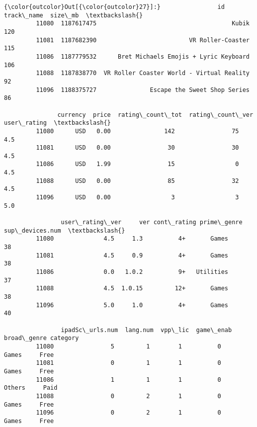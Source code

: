 \documentclass[11pt]{article}
\begin{document}
\begin{Verbatim}[commandchars=\\\{\}]
{\color{outcolor}Out[{\color{outcolor}27}]:}                id                                 track\_name  size\_mb  \textbackslash{}
         11080  1187617475                                      Kubik      120   
         11081  1187682390                          VR Roller-Coaster      115   
         11086  1187779532      Bret Michaels Emojis + Lyric Keyboard      106   
         11088  1187838770  VR Roller Coaster World - Virtual Reality       92   
         11096  1188375727               Escape the Sweet Shop Series       86   
         
               currency  price  rating\_count\_tot  rating\_count\_ver  user\_rating  \textbackslash{}
         11080      USD   0.00               142                75          4.5   
         11081      USD   0.00                30                30          4.5   
         11086      USD   1.99                15                 0          4.5   
         11088      USD   0.00                85                32          4.5   
         11096      USD   0.00                 3                 3          5.0   
         
                user\_rating\_ver     ver cont\_rating prime\_genre  sup\_devices.num  \textbackslash{}
         11080              4.5     1.3          4+       Games               38   
         11081              4.5     0.9          4+       Games               38   
         11086              0.0   1.0.2          9+   Utilities               37   
         11088              4.5  1.0.15         12+       Games               38   
         11096              5.0     1.0          4+       Games               40   
         
                ipadSc\_urls.num  lang.num  vpp\_lic  game\_enab broad\_genre category  
         11080                5         1        1          0       Games     Free  
         11081                0         1        1          0       Games     Free  
         11086                1         1        1          0      Others     Paid  
         11088                0         2        1          0       Games     Free  
         11096                0         2        1          0       Games     Free  
\end{Verbatim}
            
\end{document}
